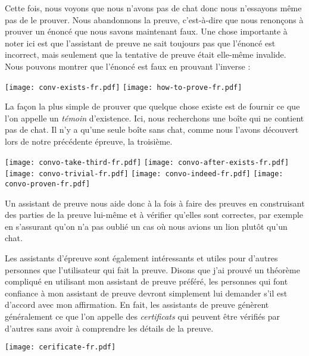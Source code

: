 Cette fois, nous voyons que nous n'avons pas de chat donc nous n'essayons même
pas de le prouver.
Nous abandonnons la preuve, c'est-à-dire que nous renonçons à prouver un
énoncé que nous savons maintenant faux.
Une chose importante à noter ici est que l'assistant de preuve ne sait toujours
pas que l'énoncé est incorrect, mais seulement que la tentative de preuve était
elle-même invalide.
Nous pouvons montrer que l'énoncé est faux en prouvant l'inverse :

\begin{center}
  \texttt{[image: conv-exists-fr.pdf]}
  \texttt{[image: how-to-prove-fr.pdf]}
\end{center}

La façon la plus simple de prouver que quelque chose existe est de fournir ce
que l'on appelle un \emph{témoin} d'existence. Ici, nous recherchons une boîte
qui ne contient pas de chat. Il n'y a qu'une seule boîte sans chat, comme nous
l'avons découvert lors de notre précédente épreuve, la troisième.

\begin{center}
  \texttt{[image: convo-take-third-fr.pdf]}
  \texttt{[image: convo-after-exists-fr.pdf]}
  \texttt{[image: convo-trivial-fr.pdf]}
  \texttt{[image: convo-indeed-fr.pdf]}
  \texttt{[image: convo-proven-fr.pdf]}
\end{center}

Un assistant de preuve nous aide donc à la fois à faire des preuves en
construisant des parties de la preuve lui-même et à vérifier qu'elles sont
correctes, par exemple en s'assurant qu'on n'a pas oublié un cas où nous avions
un lion plutôt qu'un chat.

Les assistants d'épreuve sont également intéressants et utiles pour d'autres
personnes que l'utilisateur qui fait la preuve. Disons que j'ai prouvé un
théorème compliqué en utilisant mon assistant de preuve préféré, les personnes
qui font confiance à mon assistant de preuve devront simplement lui demander
s'il est d'accord avec mon affirmation.
En fait, les assistants de preuve génèrent généralement ce que l'on appelle des
\emph{certificats} qui peuvent être vérifiés par d'autres sans avoir à
comprendre les détails de la preuve.

\begin{center}
  \texttt{[image: cerificate-fr.pdf]}
\end{center}

